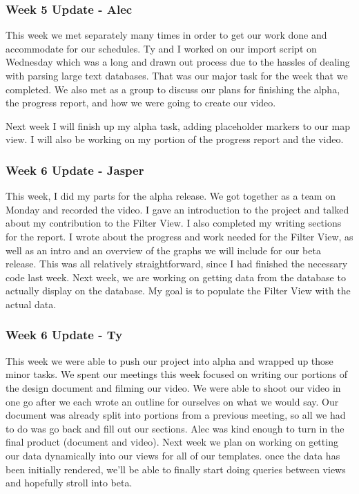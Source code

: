 \subsubsection{Week 5 Update - Alec}
This week we met separately many times in order to get our work done and accommodate for our schedules.
Ty and I worked on our import script on Wednesday which was a long and drawn out process due to the hassles of dealing with parsing large text databases.
That was our major task for the week that we completed.
We also met as a group to discuss our plans for finishing the alpha, the progress report, and how we were going to create our video.

Next week I will finish up my alpha task, adding placeholder markers to our map view. I will also be working on my portion of the progress report and the video.

\subsubsection{Week 6 Update - Jasper}
This week, I did my parts for the alpha release.
We got together as a team on Monday and recorded the video.
I gave an introduction to the project and talked about my contribution to the Filter View.
I also completed my writing sections for the report.
I wrote about the progress and work needed for the Filter View, as well as an intro and an overview of the graphs we will include for our beta release.
This was all relatively straightforward, since I had finished the necessary code last week.
Next week, we are working on getting data from the database to actually display on the database.
My goal is to populate the Filter View with the actual data.

\subsubsection{Week 6 Update - Ty}
This week we were able to push our project into alpha and wrapped up those minor tasks.
We spent our meetings this week focused on writing our portions of the design document and filming our video.
We were able to shoot our video in one go after we each wrote an outline for ourselves on what we would say.
Our document was already split into portions from a previous meeting, so all we had to do was go back and fill out our sections.
Alec was kind enough to turn in the final product (document and video).
Next week we plan on working on getting our data dynamically into our views for all of our templates.
once the data has been initially rendered, we'll be able to finally start doing queries between views and hopefully stroll into beta.

